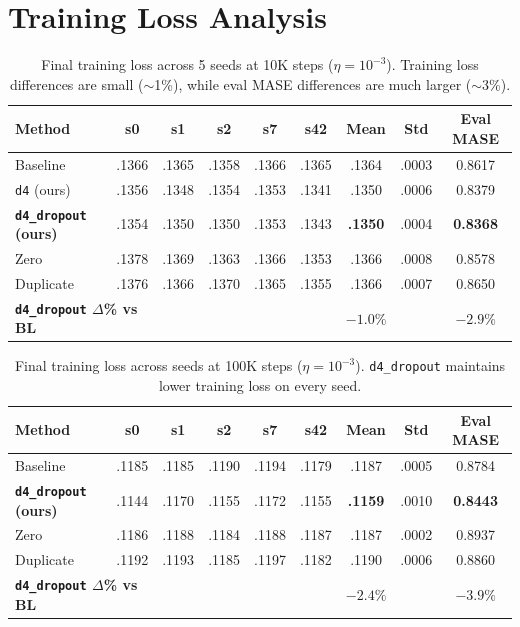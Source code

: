 \documentclass{article}
\begin{document}
\section{Training Loss Analysis}
\label{app:trainloss}

\begin{table}[H]
\centering
\caption{Final training loss across 5 seeds at 10K steps ($\eta = 10^{-3}$). Training loss differences are small ($\sim$1\%), while eval MASE differences are much larger ($\sim$3\%).}
\small
\begin{tabular}{lcccccccc}
\toprule
\textbf{Method} & \textbf{s0} & \textbf{s1} & \textbf{s2} & \textbf{s7} & \textbf{s42} & \textbf{Mean} & \textbf{Std} & \textbf{Eval MASE} \\
\midrule
Baseline & .1366 & .1365 & .1358 & .1366 & .1365 & .1364 & .0003 & 0.8617 \\
\texttt{d4} (ours) & .1356 & .1348 & .1354 & .1353 & .1341 & .1350 & .0006 & 0.8379 \\
\textbf{\texttt{d4\_dropout} (ours)} & .1354 & .1350 & .1350 & .1353 & .1343 & \textbf{.1350} & .0004 & \textbf{0.8368} \\
Zero & .1378 & .1369 & .1363 & .1366 & .1353 & .1366 & .0008 & 0.8578 \\
Duplicate & .1376 & .1366 & .1370 & .1365 & .1355 & .1366 & .0007 & 0.8650 \\
\midrule
\multicolumn{2}{l}{\textbf{\texttt{d4\_dropout} $\Delta$\% vs BL}} & & & & & $-1.0\%$ & & $-2.9\%$ \\
\bottomrule
\end{tabular}
\end{table}

\begin{table}[H]
\centering
\caption{Final training loss across seeds at 100K steps ($\eta = 10^{-3}$). \texttt{d4\_dropout} maintains lower training loss on every seed.}
\small
\begin{tabular}{lcccccccc}
\toprule
\textbf{Method} & \textbf{s0} & \textbf{s1} & \textbf{s2} & \textbf{s7} & \textbf{s42} & \textbf{Mean} & \textbf{Std} & \textbf{Eval MASE} \\
\midrule
Baseline & .1185 & .1185 & .1190 & .1194 & .1179 & .1187 & .0005 & 0.8784 \\
\textbf{\texttt{d4\_dropout} (ours)} & .1144 & .1170 & .1155 & .1172 & .1155 & \textbf{.1159} & .0010 & \textbf{0.8443} \\
Zero & .1186 & .1188 & .1184 & .1188 & .1187 & .1187 & .0002 & 0.8937 \\
Duplicate & .1192 & .1193 & .1185 & .1197 & .1182 & .1190 & .0006 & 0.8860 \\
\midrule
\multicolumn{2}{l}{\textbf{\texttt{d4\_dropout} $\Delta$\% vs BL}} & & & & & $-2.4\%$ & & $-3.9\%$ \\
\bottomrule
\end{tabular}
\end{table}
\end{document}
